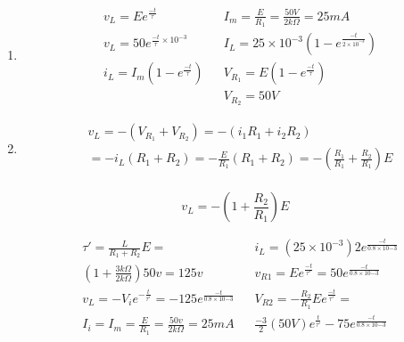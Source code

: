 \begin{enumerate}
	\item
	      \begin{align*}
		       & v_{L}=Ee^{\frac{-t}{\tau}}                       &  & I_{m}=\frac{E}{R_{1}}=\frac{50V}{2k\Omega}=25mA                        \\
		       & v_{L}=50e^{\frac{-t}{\tau} \times 10^{-3}}       &  & I_{L}= 25\times 10^{-3} \left( 1-e^{\frac{-t}{2\times10^{-3}}} \right) \\
		       & i_{L}=I_{m} \left( 1-e^{\frac{-t}{\tau}} \right) &  & V_{R_{1}}=E \left( 1-e^{\frac{-t}{\tau}} \right)                       \\
		       &                                                  &  & V_{R_{2}}=50V
	      \end{align*}

	\item \begin{align*}
		       & v_{L}=- \left( V_{R_{1}}+V_{R_{2}} \right)=-\left( i_{1}R_{1}+i_{2}R_{2} \right)                                                        \\
		       & =-i_{L}\left( R_{1}+R_{2} \right)=-\frac{E}{R_{1}} \left( R_{1}+R_{2} \right)=- \left( \frac{R_{1}}{R_{1}}+\frac{R_{2}}{R_{1}} \right)E \\
	      \end{align*}

	      \begin{equation}
		      v_{L}= -\left( 1+ \frac{R_{2}}{R_{1}}\right)E
	      \end{equation}

	      \begin{align*}
		       & \tau'= \frac{L}{R_{1}+R_{2}}E=                                      &  & i_{L}= \left(25\times 10^{-3}\right)2e^{\frac{-t}{0.8\times10{-3}}}              \\
		       & \left(1+\frac{3k\Omega}{2k\Omega}\right)50v=125v                    &  & v_{R1}=Ee^{\frac{-t}{\tau'}}=50e^{\frac{-t}{0.8\times10{-3}}}                    \\
		       & v_{L}=-V_{i}e^{-\frac{t}{\tau'}}=-125e^{\frac{-t}{0.8\times10{-3}}} &  & V_{R2}=-\frac{R_{2}}{R_{1}}Ee^{\frac{-t}{\tau'}}=                                \\
		       & I_{i}=I_{m}=\frac{E}{R_{1}}=\frac{50v}{2k\Omega}=25mA               &  & \frac{-3}{2}\left(50V\right)e^{\frac{t}{\tau'}}-75e^{\frac{-t}{0.8\times10{-3}}}
	      \end{align*}
\end{enumerate}


